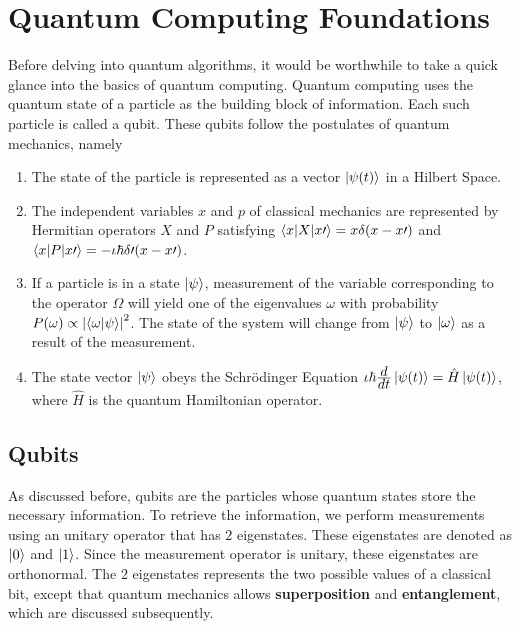 \section{Quantum Computing Foundations}
\noindent Before delving into quantum algorithms, it would be worthwhile to take a quick glance into the basics of quantum computing. Quantum computing uses the quantum state of a particle as the building block of information. Each such particle is called a qubit. These qubits follow the postulates of quantum mechanics\cite{shankar}, namely
\begin{enumerate}
\item The state of the particle is represented as a vector $\left\vert \psi(t)\right\rangle$ in a Hilbert Space.
\item The independent variables $x$ and $p$ of classical mechanics are represented by Hermitian operators $X$ and $P$ satisfying $\left\langle x\vert X\vert x\prime\right\rangle=x\delta(x-x\prime)$ and $\left\langle x\vert P\vert x\prime\right\rangle=-\iota\hbar\delta\prime(x-x\prime)$.
\item If a particle is in a state $\left\vert \psi\right\rangle$, measurement of the variable corresponding to the operator $\Omega$ will yield one of the eigenvalues $\omega$ with probability $P(\omega)\propto\left\lvert\left\langle \omega\vert \psi\right\rangle\right\rvert ^2$. The state of the system will change from $\left\vert \psi\right\rangle$ to $\left\vert \omega\right\rangle$ as a result of the measurement.
\item The state vector $\left\vert \psi\right\rangle$ obeys the Schrödinger Equation $\iota\hbar\frac{\displaystyle d}{\displaystyle dt}\left\vert \psi(t)\right\rangle=\hat{H}\left\vert \psi(t)\right\rangle$, where $\hat{H}$ is the quantum Hamiltonian operator.
\end{enumerate}
\subsection{Qubits}
As discussed before, qubits are the particles whose quantum states store the necessary information. To retrieve the information, we perform measurements using an unitary operator that has $2$ eigenstates. These eigenstates are denoted as $\left\vert 0\right\rangle$ and $\left\vert 1\right\rangle$. Since the measurement operator is unitary, these eigenstates are orthonormal. The $2$ eigenstates represents the two possible values of a classical bit, except that quantum mechanics allows \textbf{superposition} and \textbf{entanglement}, which are discussed subsequently.
